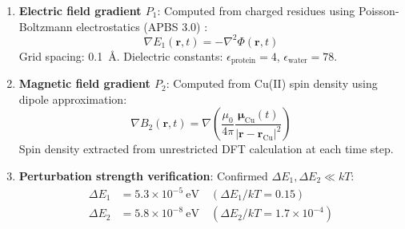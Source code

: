 \documentclass[twocolumn,10pt]{article}
\begin{document}
\begin{enumerate}
\item \textbf{Electric field gradient $P_1$}: Computed from charged residues 
using Poisson-Boltzmann electrostatics (APBS 3.0) \cite{Baker2001}:
%
\begin{equation}
\nabla E_1(\mathbf{r}, t) = -\nabla^2 \Phi(\mathbf{r}, t)
\label{eq:p1_computation}
\end{equation}
%
Grid spacing: 0.1~\AA. Dielectric constants: $\epsilon_{\text{protein}} = 4$, 
$\epsilon_{\text{water}} = 78$.

\item \textbf{Magnetic field gradient $P_2$}: Computed from Cu(II) spin density 
using dipole approximation:
%
\begin{equation}
\nabla B_2(\mathbf{r}, t) = \nabla \left( \frac{\mu_0}{4\pi} \frac{\boldsymbol{\mu}_{\text{Cu}}(t)}{|\mathbf{r} - \mathbf{r}_{\text{Cu}}|^2} \right)
\label{eq:p2_computation}
\end{equation}
%
Spin density extracted from unrestricted DFT calculation at each time step.

\item \textbf{Perturbation strength verification}: Confirmed $\Delta E_1, \Delta E_2 \ll kT$:
%
\begin{align}
\Delta E_1 &= 5.3 \times 10^{-5}~\text{eV} \quad (\Delta E_1/kT = 0.15) \\
\Delta E_2 &= 5.8 \times 10^{-8}~\text{eV} \quad (\Delta E_2/kT = 1.7 \times 10^{-4})
\end{align}
\end{enumerate}
\end{document}
